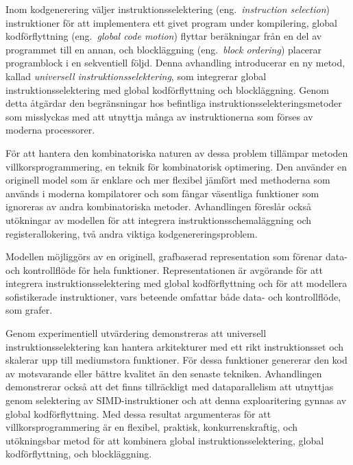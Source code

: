 %

\begin{sammanfattning}
  Inom kodgenerering v\"aljer instruktionsselektering (eng.\ \emph{instruction
    selection}) instruktioner f\"or att implementera ett givet program under
  kompilering, global kodf\"orflyttning (eng.\ \emph{global code motion})
  flyttar ber\"akningar fr\r{a}n en del av programmet till en annan, och
  blockl\"aggning (eng.\ \emph{block ordering}) placerar programblock i en
  sekventiell f\"oljd.
  Denna avhandling introducerar en ny metod, kallad \emph{universell
    instruktionsselektering}, som integrerar global instruktionsselektering med
  global kodf\"orflyttning och blockl\"aggning.
  Genom detta \r{a}tg\"ardar den begr\"ansningar hos befintliga
  instruktionsselekteringsmetoder som misslyckas med att utnyttja m\r{a}nga av
  instruktionerna som f\"orses av moderna processorer.

  F\"or att hantera den kombinatoriska naturen av dessa problem till\"ampar
  metoden villkorsprogrammering, en teknik f\"or kombinatorisk optimering.
  Den anv\"ander en originell model som \"ar enklare och mer flexibel
  j\"amf\"ort med methoderna som anv\"ands i moderna kompilatorer och som
  f\r{a}ngar v\"asentliga funktioner som ignoreras av andra kombinatoriska
  metoder.
  Avhandlingen f\"oresl\r{a}r ocks\r{a} ut\"okningar av modellen f\"or att
  integrera instruktionsschemal\"aggning och registerallokering, tv\r{a} andra
  viktiga kodgenereringsproblem.

  Modellen m\"ojligg\"ors av en originell, grafbaserad representation som
  f\"orenar data- och kontrollfl\"ode f\"or hela funktioner.
  Representationen \"ar avg\"orande f\"or att integrera instruktionsselektering
  med global kodf\"orflyttning och f\"or att modellera sofistikerade
  instruktioner, vars beteende omfattar b\r{a}de data- och kontrollfl\"ode, som
  grafer.

  Genom experimentiell utv\"ardering demonstreras att universell
  instruktionsselektering kan hantera arkitekturer med ett rikt instruktionsset
  och skalerar upp till mediumstora funktioner.
  F\"or dessa funktioner genererar den kod av motsvarande eller b\"attre
  kvalitet \"an den senaste tekniken.
  Avhandlingen demonstrerar ocks\r{a} att det finns tillr\"ackligt med
  dataparallelism att utnyttjas genom selektering av SIMD-instruktioner och att
  denna exploaritering gynnas av global kodf\"orflyttning.
  Med dessa resultat argumenteras f\"or att villkorsprogrammering \"ar en
  flexibel, praktisk, konkurrenskraftig, och ut\"okningsbar metod f\"or att
  kombinera global instruktionsselektering, global kodf\"orflyttning, och
  blockl\"aggning.
\end{sammanfattning}
